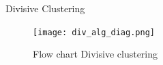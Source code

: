 \documentclass{beamer}
\begin{document}
\begin{frame}{Divisive Clustering}
\begin{figure}
        \centering
        \texttt{[image: div\_alg\_diag.png]}
        \label{fig:enter-label}
        \caption{Flow chart Divisive clustering}
\end{figure}
\end{frame}
\end{document}

